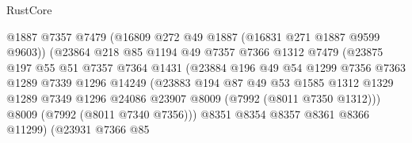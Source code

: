 \begin{lexlean}{RustCore}
\begin{coremodule}
                                  @1887
                                  @7357
                                  @7479
                                  (@16809 @272 @49 @1887 (@16831 @271 @1887 @9599 @9603))
                                  (@23864
                                    @218
                                    @85
                                    @1194
                                    @49
                                    @7357
                                    @7366
                                    @1312
                                    @7479
                                    (@23875
                                      @197
                                      @55
                                      @51
                                      @7357
                                      @7364
                                      @1431
                                      (@23884
                                        @196
                                        @49
                                        @54
                                        @1299
                                        @7356
                                        @7363
                                        @1289
                                        @7339
                                        @1296
                                        @14249
                                        (@23883
                                          @194
                                          @87
                                          @49
                                          @53
                                          @1585
                                          @1312
                                          @1329
                                          @1289
                                          @7349
                                          @1296
                                          @24086
                                          @23907
                                          @8009
                                          (@7992 (@8011 @7350 @1312)))
                                        @8009
                                        (@7992 (@8011 @7340 @7356)))
                                      @8351
                                      @8354
                                      @8357
                                      @8361
                                      @8366
                                      @11299)
                                    (@23931
                                      @7366
                                      @85

\end{coremodule}
\end{lexlean}
